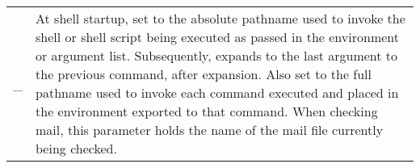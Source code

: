 \begin{longtable}{p{}p{}}
\_ &

At shell startup, set to the absolute pathname used to invoke the shell or shell script being executed as passed in the environment or argument list. Subsequently, expands to the last argument to the previous command, after expansion. Also set to the full pathname used to invoke each command executed and placed in the environment exported to that command. When checking mail, this parameter holds the name of the mail file currently being checked. \\

\end{longtable}